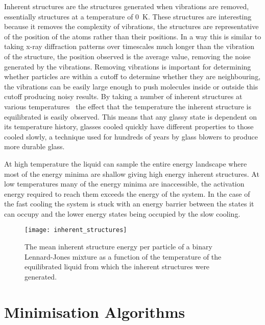 Inherent structures are the structures generated when vibrations are removed, essentially structures at a temperature of \SI{0}{\kelvin}. These structures are interesting because it removes the complexity of vibrations, the structures are representative of the position of the atoms rather than their positions. In a way this is similar to taking x-ray diffraction patterns over timescales much longer than the vibration of the structure, the position observed is the average value, removing the noise generated by the vibrations. Removing vibrations is important for determining whether particles are within a cutoff to determine whether they are neighbouring, the vibrations can be easily large enough to push molecules inside or outside this cutoff producing noisy results. By taking a number of inherent structures at various temperatures~ the effect that the temperature the inherent structure is equilibrated is easily observed. This means that any glassy state is dependent on its temperature history, glasses cooled quickly have different properties to those cooled slowly, a technique used for hundreds of years by glass blowers to produce more durable glass\tocite.

At high temperature the liquid can sample the entire energy landscape where most of the energy minima are shallow giving high energy inherent structures. At low temperatures many of the energy minima are inaccessible, the activation energy required to reach them exceeds the energy of the system. In the case of the fast cooling the system is stuck with an energy barrier between the states it can occupy and the lower energy states being occupied by the slow cooling.

\begin{figure}
    \centering
    \texttt{[image: inherent\_structures]}
    \caption[The mean inherent structure energy as a function of temperature]{The mean inherent structure energy per particle of a binary Lennard-Jones mixture as a function of the temperature of the equilibrated liquid from which the inherent structures were generated.}
    \label{fig:inherent structures}
\end{figure}

\section{Minimisation Algorithms}

